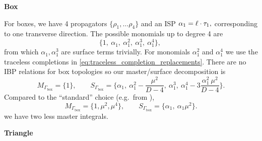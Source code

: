 \textbf{Box}

For boxes, we have  4 propagators $\{\rho_1,\ldots{}\rho_4\}$ and an ISP $ \alpha_1 = \sp(\ell,\tau_1), $
corresponding to one transverse direction.
The possible monomials up to degree 4 are 
\[
  \{1,~\alpha_1,~\alpha_1^2,~\alpha_1^3,~\alpha_1^4\},~
\]
from which $\alpha_1,\alpha_1^3$ are surface terms trivially.
For monomials $\alpha_1^2$ and $\alpha_1^4$ we use the traceless completions in
\cref{eq:traceless_completion_replacements}. There are no IBP relations for box topologies so
our master/surface decomposition is
\[
  M_{\Gamma_\text{box} } = \{1\}, \qquad S_{\Gamma_\text{box} } = \{\alpha_1,~ \alpha_1^2 - \frac{\mu^2}{D-4},~ \alpha_1^3,~ \alpha_1^4 - 3 \frac{\alpha_1^2~\mu^2}{D-4}\}.
\]
Compared to the ``standard'' choice (e.g.\ from \cite{Giele:2008ve}),
\[
  M_{\Gamma_\text{box} } = \{1, \mu^2, \mu^4\}, \qquad S_{\Gamma_\text{box} } = \{\alpha_1,~ \alpha_1 \mu^2 \}.
\]
we have two less master integrals.



\textbf{Triangle}

